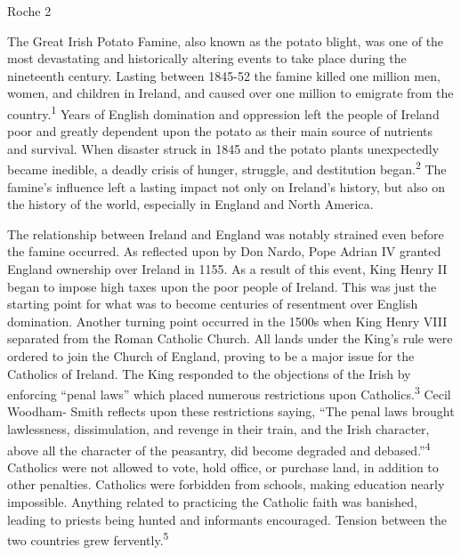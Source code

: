 

\thispagestyle{empty}
\begin{flushright}Roche 2\end{flushright}
\bigskip
\begin{Spacing}{1.5}

\hspace{.4in}The Great Irish Potato Famine, also known as the potato blight, was one of the most devastating and historically altering events to take place during the nineteenth century. Lasting between 1845-52 the famine killed one million men, women, and children in Ireland, and caused over one million to emigrate from the country.\textsuperscript{1}  Years of English domination and oppression left the people of Ireland poor and greatly dependent upon the potato as their main source of nutrients and survival. When disaster struck in 1845 and the potato plants unexpectedly became inedible, a deadly crisis of hunger, struggle, and destitution began.\textsuperscript{2}  The famine’s influence left a lasting impact not only on Ireland’s history, but also on the history of the world, especially in England and North America.

\hspace{.4in}The relationship between Ireland and England was notably strained even before the famine occurred. As reflected upon by Don Nardo, Pope Adrian IV granted England ownership over Ireland in 1155. As a result of this event, King Henry II began to impose high taxes upon the poor people of Ireland. This was just the starting point for what was to become centuries of resentment over English domination. Another turning point occurred in the 1500s when King Henry VIII separated from the Roman Catholic Church. All lands under the King’s rule were ordered to join the Church of England, proving to be a major issue for the Catholics of Ireland. The King responded to the objections of the Irish by enforcing “penal laws” which placed numerous restrictions upon Catholics.\textsuperscript{3}  Cecil Woodham- Smith reflects upon these restrictions saying, “The penal laws brought lawlessness, dissimulation, and revenge in their train, and the Irish character, above all the character of the peasantry, did become degraded and debased.”\textsuperscript{4}  Catholics were not allowed to vote, hold office, or purchase land, in addition to other penalties. Catholics were forbidden from schools, making education nearly impossible. Anything related to practicing the Catholic faith was banished, leading to priests being hunted and informants encouraged. Tension between the two countries grew fervently.\textsuperscript{5} 


\end{Spacing}

